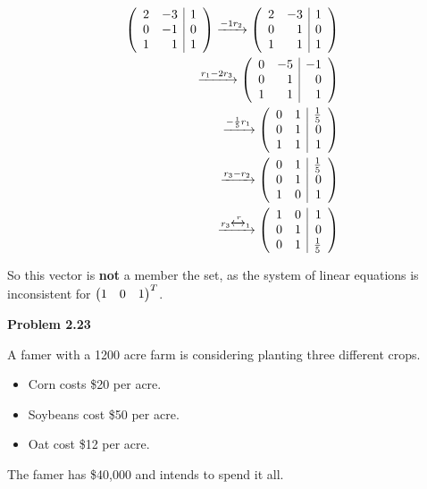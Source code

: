 \documentclass[12pt]{article}
\newenvironment{problem}[1][default]{
  \begin{framed}\begin{minipage}{0.97\textwidth}
  \setlength{\parskip}{4mm}
  {\bf Problem #1}
}{\end{minipage}\end{framed}}
\newenvironment{abc}{\begin{enumerate}[label={\bf(\alph*)}]}{\end{enumerate}}
\newcommand\m[2][]{
	\ifthenelse{\equal {#1} {}}
		{\begin{pmatrix*}[r]#2\end{pmatrix*}}
		{\left(\begin{array}{#1}#2\end{array}\right)}
}
\begin{document}
\begin{abc}
\begin{item}
	\begin{equation}
	\begin{aligned}
		\m[rr|r]{2 & -3 & 1 \\ 0 & -1 & 0 \\ 1 & 1 & 1}
		\xrightarrow{-1r_2}
		\m[rr|r]{2 & -3 & 1 \\ 0 & 1 & 0 \\ 1 & 1 & 1}
		\\
		\xrightarrow{r_1 - 2r_3}
		\m[rr|r]{0 & -5 & -1 \\ 0 & 1 & 0 \\ 1 & 1 & 1}
		\\
		\xrightarrow{-\frac{1}{5}r_1}
		\m[rr|r]{0 & 1 & \frac{1}{5} \\ 0 & 1 & 0 \\ 1 & 1 & 1}
		\\
		\xrightarrow{r_3 - r_2}
		\m[rr|r]{0 & 1 & \frac{1}{5} \\ 0 & 1 & 0 \\ 1 & 0 & 1}
		\\
		\xrightarrow{r_3 \xleftrightarrow r_1}
		\m[rr|r]{1 & 0 & 1 \\ 0 & 1 & 0 \\ 0 & 1 & \frac{1}{5}}
	\end{aligned}
	\end{equation}

	So this vector is \textbf{not} a member the set, as the system of linear equations is inconsistent for $\m{1 & 0 & 1}^T$.
	\end{item}
\end{abc}

\begin{problem}[2.23]
	A famer with a 1200 acre farm is considering planting three different crops.

	\begin{itemize}
		\item Corn costs \$20 per acre.
		\item Soybeans cost \$50 per acre.
		\item Oat cost \$12 per acre.
	\end{itemize}

	The famer has \$40,000 and intends to spend it all.
\end{problem}
\end{document}
